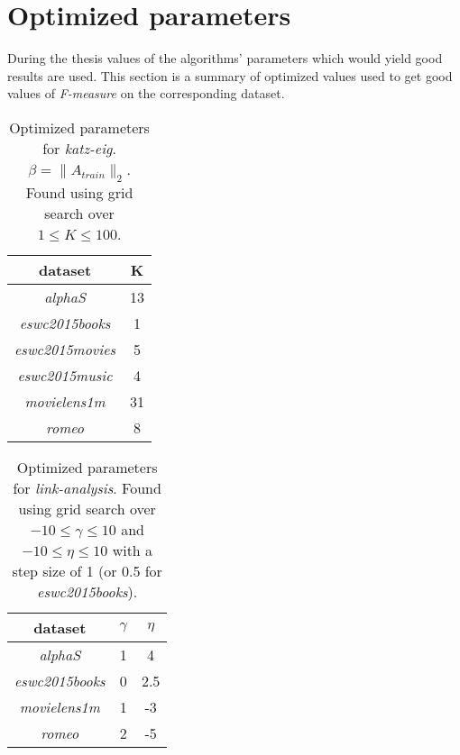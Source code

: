 
\chapter{Optimized parameters}\label{app:opt_params}

During the thesis values of the algorithms' parameters which would yield good results are used. This section is a summary of optimized values used to get good values of \textit{F-measure} on the corresponding dataset.

\begin{table}[h!]
    \centering
    \begin{tabular}{| c | c |}
        \hline
        \textbf{dataset}                & K \\ \hline
        \textit{alphaS}         & 13 \\ \hline
        \textit{eswc2015books}  & 1 \\ \hline
        \textit{eswc2015movies} & 5 \\ \hline
        \textit{eswc2015music}  & 4 \\ \hline
        \textit{movielens1m}    & 31 \\ \hline
        \textit{romeo}          & 8 \\ \hline
    \end{tabular}
    \caption{Optimized parameters for \textit{katz-eig}. $\beta = \|A_{train}\|_2$. Found using grid search over $1 \leq K \leq 100$.}
    \label{tab:katzeig_params_used}
\end{table}

\begin{table}[h!]
    \centering
    \begin{tabular}{| c | c | c |}
        \hline
        \textbf{dataset} & \textbf{$\gamma$} & \textbf{$\eta$} \\ \hline
        \textit{alphaS}         & 1    & 4 \\ \hline
        \textit{eswc2015books}  & 0    & 2.5 \\ \hline
        \textit{movielens1m}    & 1    & -3 \\ \hline
        \textit{romeo}          & 2    & -5 \\ \hline
    \end{tabular}
    \caption{Optimized parameters for \textit{link-analysis}. Found using grid search over $-10 \leq \gamma \leq 10$ and $-10 \leq \eta \leq 10$ with a step size of 1 (or 0.5 for \textit{eswc2015books}).}
    \label{tab:linkanalysis_params_used}
\end{table}

